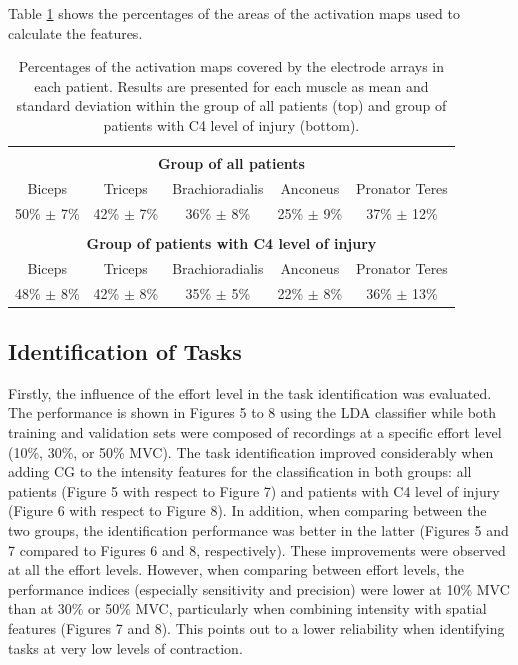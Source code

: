 Table \ref{tb:2-2} shows the percentages of the areas of the activation maps used to calculate the features.

\begin{table}[]
\centering
\caption{Percentages of the activation maps covered by the electrode arrays in each patient. Results are presented for each muscle as mean and standard deviation within the group of all patients (top) and group of patients with C4 level of injury (bottom).}
\label{tb:2-2}
\begin{tabular}{ccccc}
 & & & &\\
               \multicolumn{5}{c}{\textbf{Group of all patients}}                     \\
Biceps         & Triceps         & Brachioradialis  & Anconeus        & Pronator Teres  \\\hline
        
50\% $\pm$ 7\% & 42\% $\pm$ 7\%  & 36\% $\pm$ 8\%   & 25\% $\pm$ 9\%  & 37\% $\pm$ 12\% \\
               &                 &                  &                 &                 \\
              \multicolumn{5}{c}{\textbf{Group of patients with C4 level of injury}} \\
Biceps         & Triceps         & Brachioradialis  & Anconeus        & Pronator Teres  \\ \hline
     
48\% $\pm$ 8\% & 42\% $\pm$ 8\%  & 35\% $\pm$ 5\%   & 22\% $\pm$ 8\%  & 36\% $\pm$ 13\%
\end{tabular}
\end{table}


\subsection{Identification of Tasks}
Firstly, the influence of the effort level in the task identification was evaluated. The performance is shown in Figures 5 to 8 using the LDA classifier while both training and validation sets were composed of recordings at a specific effort level (10\%, 30\%, or 50\% MVC). The task identification improved considerably when adding CG to the intensity features for the classification in both groups: all patients (Figure 5 with respect to Figure 7) and patients with C4 level of injury (Figure 6 with respect to Figure 8). In addition, when comparing between the two groups, the identification performance was better in the latter (Figures 5 and 7 compared to Figures 6 and 8, respectively). These improvements were observed at all the effort levels. However, when comparing between effort levels, the performance indices (especially sensitivity and precision) were lower at 10\% MVC than at 30\% or 50\% MVC, particularly when combining intensity with spatial features (Figures 7 and 8). This points out to a lower reliability when identifying tasks at very low levels of contraction. 

